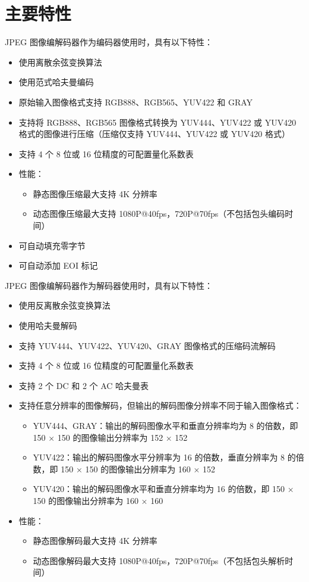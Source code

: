 \documentclass[main\_\_CN.tex]{subfiles}
\begin{document}
\section{主要特性}
\label{sec:jpegcodec-features}

JPEG 图像编解码器作为编码器使用时，具有以下特性：
\begin{itemize}
    \item 使用离散余弦变换算法
    \item 使用范式哈夫曼编码
    \item 原始输入图像格式支持 RGB888、RGB565、YUV422 和 GRAY
    \item 支持将 RGB888、RGB565 图像格式转换为 YUV444、YUV422 或 YUV420 格式的图像进行压缩（压缩仅支持 YUV444、YUV422 或 YUV420 格式）
    \item 支持 4 个 8 位或 16 位精度的可配置量化系数表
    \item 性能：
        \begin{itemize}
            \item 静态图像压缩最大支持 4K 分辨率
            \item 动态图像压缩最大支持 1080P@40fps，720P@70fps（不包括包头编码时间）
        \end{itemize}
    \item 可自动填充零字节
    \item 可自动添加 EOI 标记
\end{itemize}

JPEG 图像编解码器作为解码器使用时，具有以下特性：
\begin{itemize}
    \item 使用反离散余弦变换算法
    \item 使用哈夫曼解码
    \item 支持 YUV444、YUV422、YUV420、GRAY 图像格式的压缩码流解码
    \item 支持 4 个 8 位或 16 位精度的可配置量化系数表
    \item 支持 2 个 DC 和 2 个 AC 哈夫曼表
    \item 支持任意分辨率的图像解码，但输出的解码图像分辨率不同于输入图像格式：
        \begin{itemize}
        \item YUV444、GRAY：输出的解码图像水平和垂直分辨率均为 8 的倍数，即 150 × 150 的图像输出分辨率为 152 × 152
        \item YUV422：输出的解码图像水平分辨率为 16 的倍数，垂直分辨率为 8 的倍数，即 150 × 150 的图像输出分辨率为 160 × 152
        \item YUV420：输出的解码图像水平和垂直分辨率均为 16 的倍数，即 150 × 150 的图像输出分辨率为 160 × 160
        \end{itemize}
    \item 性能：
    \begin{itemize}
        \item 静态图像解码最大支持 4K 分辨率
        \item 动态图像解码最大支持 1080P@40fps，720P@70fps（不包括包头解析时间）
    \end{itemize}
\end{itemize}
\end{document}
